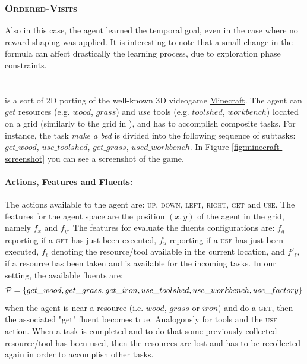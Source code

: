 \subsubsection{\textsc{Ordered-Visits}}
Also in this case, the agent learned the temporal goal, even in the case where no reward shaping was applied. It is interesting to note that a small change in the formula can affect drastically the learning process, due to exploration phase constraints.

\section{\Minecraft}
\Minecraft \citep{pmlr-v70-andreas17a} is a sort of 2D porting of the well-known 3D videogame \href{https://minecraft.net/en-us/}{Minecraft}. 
The agent can $get$ resources (e.g. $wood$, $grass$) and $use$ tools (e.g. $toolshed$, $workbench$) located on a grid (similarly to the grid in \Sapientino), and has to accomplish composite tasks. For instance, the task \emph{make a bed} is divided into the following sequence of subtasks: $get\_wood$, $use\_toolshed$, $get\_grass$, $used\_workbench$. In Figure \ref{fig:minecraft-screenshot} you can see a screenshot of the game.

\paragraph{Actions, Features and Fluents:}  The actions available to the agent are: \textsc{up, down, left, right}, \textsc{get} and \textsc{use}. The features for the agent space are the position $(x,y)$ of the agent in the grid, namely $f_x$ and $f_y$. The features for evaluate the fluents configurations are: $f_g$ reporting if a \textsc{get} has just been executed,  $f_u$ reporting if a \textsc{use} has just been executed, $f_\ell$ denoting the resource/tool available in the current location, and $f'_\ell$, if a resource has been taken and is available for the incoming tasks. In our setting, the available fluents are: $$\mathcal{P} = \{get\_wood, get\_grass, get\_iron, use\_toolshed,use\_workbench, use\_factory\}$$ 
when the agent is near a resource (i.e. $wood$, $grass$ or $iron$) and do a \textsc{get}, then the associated "get" fluent becomes true. Analogously for tools and the \textsc{use} action. When a task is completed and to do that some previously collected resource/tool has been used, then the resources are lost and has to be recollected again in order to accomplish other tasks.

